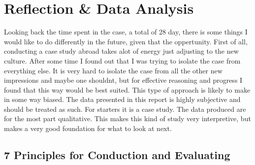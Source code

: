 \section{Reflection \& Data Analysis}
Looking back the time spent in the case, a total of 28 day, there is some things I would like to do differently in the future, given that the oppertunity. First of all, conducting a case study abroad takes alot of energy just adjusting to the new culture. 
After some time I found out that I was trying to isolate the case from everything else. 
It is very hard to isolate the case from all the other new impressions and maybe one shouldnt, but for effective reasoning and progress I found that this way would be best suited. This type of approach is likely to make in some way biased. 
The data presented in this report is highly subjective and should be treated as such. For starters it is a case study. The data produced are for the most part qualitative. This makes this kind of study very interpretive, but makes a very good foundation for what to look at next.
\subsection{7 Principles for Conduction and Evaluating}
